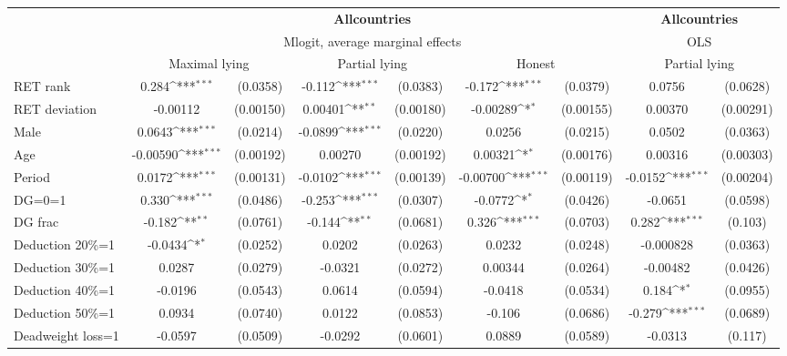 \def\sym#1{\ifmmode^{#1}\else\(^{#1}\)\fi}
\begin{tabular}{l|cccccc|cc}
\hline\hline
&\multicolumn{6}{c|}{\bf All\space{}countries}&\multicolumn{2}{c}{\bf All\space{}countries}\\ &\multicolumn{6}{c|}{Mlogit, average marginal effects }&\multicolumn{2}{c}{OLS}\\
                &\multicolumn{2}{c}{Maximal lying}&\multicolumn{2}{c}{Partial lying}&\multicolumn{2}{c}{Honest}  &\multicolumn{2}{c}{Partial lying}\\
\hline
RET rank        &    0.284\sym{***}& (0.0358)&   -0.112\sym{***}& (0.0383)&   -0.172\sym{***}& (0.0379)&   0.0756         & (0.0628)\\
RET deviation   & -0.00112         &(0.00150)&  0.00401\sym{**} &(0.00180)& -0.00289\sym{*}  &(0.00155)&  0.00370         &(0.00291)\\
Male            &   0.0643\sym{***}& (0.0214)&  -0.0899\sym{***}& (0.0220)&   0.0256         & (0.0215)&   0.0502         & (0.0363)\\
Age             & -0.00590\sym{***}&(0.00192)&  0.00270         &(0.00192)&  0.00321\sym{*}  &(0.00176)&  0.00316         &(0.00303)\\
Period          &   0.0172\sym{***}&(0.00131)&  -0.0102\sym{***}&(0.00139)& -0.00700\sym{***}&(0.00119)&  -0.0152\sym{***}&(0.00204)\\
DG=0=1          &    0.330\sym{***}& (0.0486)&   -0.253\sym{***}& (0.0307)&  -0.0772\sym{*}  & (0.0426)&  -0.0651         & (0.0598)\\
DG frac         &   -0.182\sym{**} & (0.0761)&   -0.144\sym{**} & (0.0681)&    0.326\sym{***}& (0.0703)&    0.282\sym{***}&  (0.103)\\
Deduction 20\%=1&  -0.0434\sym{*}  & (0.0252)&   0.0202         & (0.0263)&   0.0232         & (0.0248)&-0.000828         & (0.0363)\\
Deduction 30\%=1&   0.0287         & (0.0279)&  -0.0321         & (0.0272)&  0.00344         & (0.0264)& -0.00482         & (0.0426)\\
Deduction 40\%=1&  -0.0196         & (0.0543)&   0.0614         & (0.0594)&  -0.0418         & (0.0534)&    0.184\sym{*}  & (0.0955)\\
Deduction 50\%=1&   0.0934         & (0.0740)&   0.0122         & (0.0853)&   -0.106         & (0.0686)&   -0.279\sym{***}& (0.0689)\\
Deadweight loss=1&  -0.0597         & (0.0509)&  -0.0292         & (0.0601)&   0.0889         & (0.0589)&  -0.0313         &  (0.117)\\

\end{tabular}
